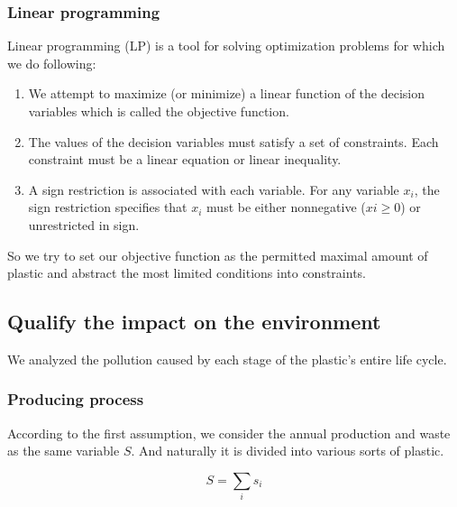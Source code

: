 \documentclass{mcmthesis}
\begin{document}
\subsubsection{Linear programming}

Linear programming\cite{Hillier} (LP) is a tool for solving optimization problems for which we do following:

\begin{enumerate}
	\item We attempt to maximize (or minimize) a linear function of the decision variables which is called the objective function. 
	\item The values of the decision variables must satisfy a set of constraints. Each constraint must be a linear equation or linear inequality.
	\item A sign restriction is associated with each variable. For any variable $x_i$, the sign restriction specifies that $x_i$ must be either nonnegative ($xi \ge 0$) or unrestricted in sign.
\end{enumerate}

So we try to set our objective function as the permitted maximal amount of plastic and abstract the most limited conditions into constraints.

%



\subsection{Qualify the impact on the environment}

We analyzed the pollution caused by each stage of the plastic's entire life cycle.

\subsubsection{Producing process}

According to the first assumption, we consider the annual production and waste as the same variable $S$. And naturally it is divided into various sorts of plastic.

\begin{equation}
S = \sum_i{s_i}
\label{S}
\end{equation}
\end{document}
